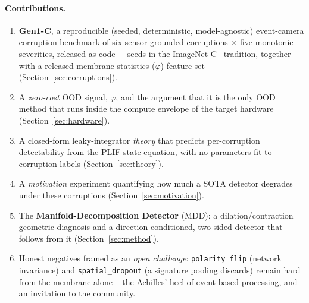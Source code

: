 \paragraph{Contributions.}
\begin{enumerate}
  \item \textbf{Gen1-C}, a reproducible (seeded, deterministic, model-agnostic) event-camera
        corruption benchmark of six sensor-grounded corruptions $\times$ five monotonic
        severities, released as code + seeds in the ImageNet-C~\cite{hendrycks2019imagenetc}
        tradition, together with a released membrane-statistics ($\varphi$) feature set
        (Section~\ref{sec:corruptions}).
  \item A \emph{zero-cost} OOD signal, $\varphi$, and the argument that it is the only OOD
        method that runs inside the compute envelope of the target hardware
        (Section~\ref{sec:hardware}).
  \item A closed-form leaky-integrator \emph{theory} that predicts per-corruption
        detectability from the PLIF state equation, with no parameters fit to corruption
        labels (Section~\ref{sec:theory}).
  \item A \emph{motivation} experiment quantifying how much a SOTA detector degrades under
        these corruptions (Section~\ref{sec:motivation}).
  \item The \textbf{Manifold-Decomposition Detector} (MDD): a dilation/contraction geometric
        diagnosis and a direction-conditioned, two-sided detector that follows from it
        (Section~\ref{sec:method}).
  \item Honest negatives framed as an \emph{open challenge}: \texttt{polarity\_flip}
        (network invariance) and \texttt{spatial\_dropout} (a signature pooling discards)
        remain hard from the membrane alone -- the Achilles' heel of event-based processing,
        and an invitation to the community.
\end{enumerate}
